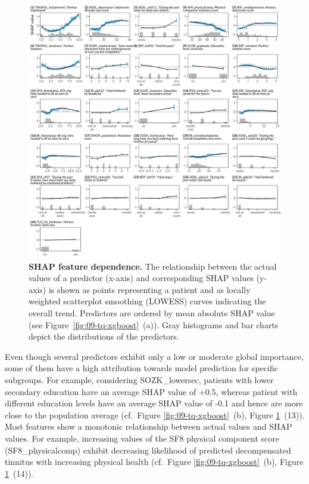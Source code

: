 \documentclass[
  oneside]{book}
\begin{document}
\begin{figure}[h]

{\centering \includegraphics[width=1\linewidth]{figures/09-tq-xgboost-shap-per-feature} 

}

\caption{\textbf{SHAP feature dependence.} The relationship between the actual values of a predictor (x-axis) and corresponding SHAP values (y-axis) is shown as points representing a patient and as locally weighted scatterplot smoothing (LOWESS) curves indicating the overall trend. Predictors are ordered by mean absolute SHAP value (see Figure~\ref{fig:09-tq-xgboost}~(a)). Gray histograms and bar charts depict the distributions of the predictors.}\label{fig:09-tq-xgboost-shap-per-feature}
\end{figure}

Even though several predictors exhibit only a low or moderate global importance, some of them have a high attribution towards model prediction for specific subgroups.
For example, considering SOZK\_lowersec, patients with lower secondary education have an average SHAP value of +0.5, whereas patient with different education levels have an average SHAP value of -0.1 and hence are more close to the population average (cf.~Figure \ref{fig:09-tq-xgboost}~(b), Figure \ref{fig:09-tq-xgboost-shap-per-feature}~(13)).
Most features show a monotonic relationship between actual values and SHAP values.
For example, increasing values of the SF8 physical component score (SF8\_physicalcomp) exhibit decreasing likelihood of predicted decompensated tinnitus with increasing physical health (cf.~Figure \ref{fig:09-tq-xgboost}~(b), Figure \ref{fig:09-tq-xgboost-shap-per-feature}~(14)).
\end{document}
